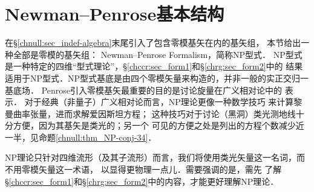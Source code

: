 \section{Newman--Penrose基本结构}\label{chnull:sec_NP1}
在\S\ref{chnull:sec_indef-algebra}末尾引入了包含零模基矢在内的基矢组，
本节给出一种全部是零模的基矢组：
Newman--Penrose Formalism\cite{newman-Penrose-1962}，简称NP型式．
NP型式是一种特定的四维“型式理论”，\S\ref{chccr:sec_form1}和\S\ref{chrg:sec_form2}中的
结果适用于NP型式．NP型式基底是由四个零模矢量来构造的，并非一般的实正交归一基底场．
Penrose引入零模基矢最重要的目的是讨论{\kaishu 旋量}在广义相对论中的
表示\cite{penrose-Rindler1984,penrose-Rindler1986}．
对于经典（非量子）广义相对论而言，NP理论更像一种数学技巧
来计算黎曼曲率张量，进而求解爱因斯坦方程；
这种技巧对于讨论（黑洞）类光测地线十分方便，因为其基矢是类光的；另一个
可见的方便之处是列出的方程个数减少近一半，见命题\ref{chnull:thm_NP-conj-34}．


NP理论只针对四维流形（及其子流形）而言，我们将使用类光矢量这一名词，而不用零模矢量这一术语，
以显得更物理一点儿．需要强调的是，需先
了解\S\ref{chccr:sec_form1}和\S\ref{chrg:sec_form2}中的内容，才能更好理解NP理论．


